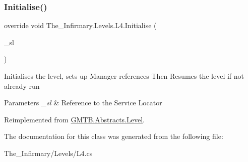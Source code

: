 \subsubsection{\texorpdfstring{Initialise()}{Initialise()}}
{\footnotesize\ttfamily override void The\+\_\+\+Infirmary.\+Levels.\+L4.\+Initialise (\begin{DoxyParamCaption}\item[{\mbox{\hyperlink{interface_g_m_t_b_1_1_interfaces_1_1_i_service_locator}{I\+Service\+Locator}}}]{\+\_\+sl }\end{DoxyParamCaption})\hspace{0.3cm}{\ttfamily [virtual]}}



Initialises the level, sets up Manager references Then Resumes the level if not already run 


\begin{DoxyParams}{Parameters}
{\em \+\_\+sl} & Reference to the Service Locator \\
\hline
\end{DoxyParams}


Reimplemented from \mbox{\hyperlink{class_g_m_t_b_1_1_abstracts_1_1_level_a0048401bb0fb66b0fb0c19b3b25e4265}{G\+M\+T\+B.\+Abstracts.\+Level}}.



The documentation for this class was generated from the following file\+:\begin{DoxyCompactItemize}
\item 
The\+\_\+\+Infirmary/\+Levels/L4.\+cs\end{DoxyCompactItemize}
